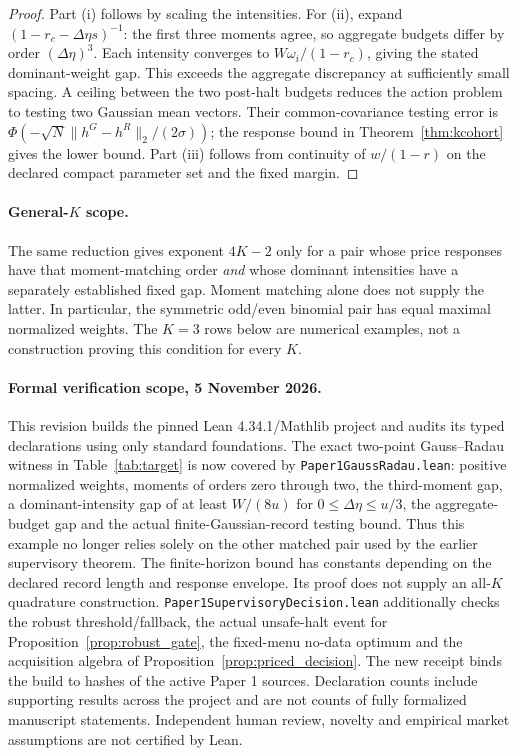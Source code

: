 \documentclass[12pt]{article}
\theoremstyle{definition}
\theoremstyle{remark}
\begin{document}
\begin{proof}
Part (i) follows by scaling the intensities. For (ii), expand $(1-r_c-\Delta\eta s)^{-1}$: the first three moments agree, so aggregate budgets differ by order $(\Delta\eta)^3$. Each intensity converges to $W\omega_i/(1-r_c)$, giving the stated dominant-weight gap. This exceeds the aggregate discrepancy at sufficiently small spacing. A ceiling between the two post-halt budgets reduces the action problem to testing two Gaussian mean vectors. Their common-covariance testing error is $\Phi(-\sqrt N\|h^G-h^R\|_2/(2\sigma))$; the response bound in Theorem~\ref{thm:kcohort} gives the lower bound. Part (iii) follows from continuity of $w/(1-r)$ on the declared compact parameter set and the fixed margin.
\end{proof}

\paragraph{General-$K$ scope.} The same reduction gives exponent $4K-2$ only for a pair whose price responses have that moment-matching order \emph{and} whose dominant intensities have a separately established fixed gap. Moment matching alone does not supply the latter. In particular, the symmetric odd/even binomial pair has equal maximal normalized weights. The $K=3$ rows below are numerical examples, not a construction proving this condition for every $K$.

\paragraph{Formal verification scope, 5 November 2026.} This revision builds the pinned Lean 4.34.1/Mathlib project and audits its typed declarations using only standard foundations. The exact two-point Gauss--Radau witness in Table~\ref{tab:target} is now covered by \nolinkurl{Paper1GaussRadau.lean}: positive normalized weights, moments of orders zero through two, the third-moment gap, a dominant-intensity gap of at least $W/(8u)$ for $0\le\Delta\eta\le u/3$, the aggregate-budget gap and the actual finite-Gaussian-record testing bound. Thus this example no longer relies solely on the other matched pair used by the earlier supervisory theorem. The finite-horizon bound has constants depending on the declared record length and response envelope. Its proof does not supply an all-$K$ quadrature construction. \nolinkurl{Paper1SupervisoryDecision.lean} additionally checks the robust threshold/fallback, the actual unsafe-halt event for Proposition~\ref{prop:robust_gate}, the fixed-menu no-data optimum and the acquisition algebra of Proposition~\ref{prop:priced_decision}. The new receipt binds the build to hashes of the active Paper 1 sources. Declaration counts include supporting results across the project and are not counts of fully formalized manuscript statements. Independent human review, novelty and empirical market assumptions are not certified by Lean.
\end{document}
